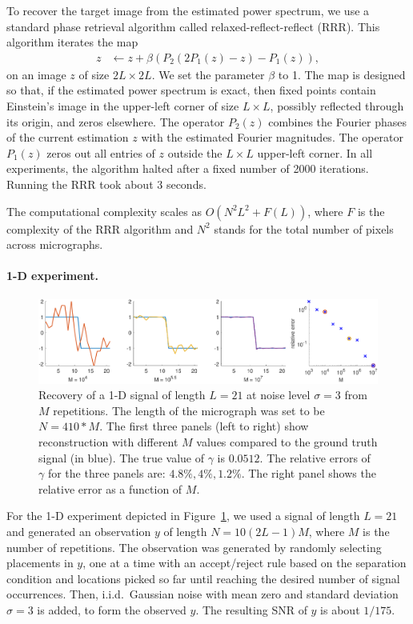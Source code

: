 \documentclass[9pt,twocolumn,twoside,lineno]{pnas-new}
\begin{document}
To recover the target image from the estimated power spectrum, we use a standard phase retrieval algorithm called relaxed-reflect-reflect (RRR). This algorithm iterates the map
\begin{align*}
z & \leftarrow z + \beta (P_2(2P_1(z) - z) - P_1(z)),
\end{align*}
on an image $z$ of size $2L\times 2L$.
We set the parameter $\beta$ to 1.
The map is designed so that, if the estimated power spectrum is exact, then fixed points contain Einstein's image in the upper-left corner of size $L \times L$, possibly reflected through its origin, and zeros elsewhere. The operator $P_2(z)$ combines the Fourier phases of  the current estimation $z$ with the estimated Fourier magnitudes. The operator $P_1(z)$ zeros out all entries of $z$ outside the $L\times L$ upper-left corner. In all experiments, the algorithm halted after a fixed number of 2000 iterations. Running the RRR took about 3 seconds. 

The computational complexity scales as $O(N^2L^2 + F(L))$, where $F$ is the complexity of the RRR algorithm and $N^2$ stands for the total number of pixels across micrographs. 

\paragraph{1-D experiment.}


\begin{figure}[t]
	\centering
	\includegraphics[width=\linewidth]{1D_example}
	\caption{\label{fig:1D_example} Recovery of a 1-D signal of length $L=21$ at noise level $\sigma = 3$ from $M$ repetitions. The length of the micrograph was set to be $N = 410*M$. The first three panels (left to right) show reconstruction with different $M$ values compared to the ground truth signal (in blue).
		The true value of $\gamma$ is $0.0512$.
		The relative errors of $\gamma$ for the three panels are: $4.8\%,4\%,1.2\%$. The right panel shows the relative error as a function of $M$. 
	}
\end{figure}



For the 1-D experiment depicted in Figure~\ref{fig:1D_example}, we used a signal of length $L=21$ and generated an observation $y$ of length $N = 10(2L-1)M$, where $M$ is the number of repetitions. 
The observation was generated by randomly selecting placements in $y$, one at a time with an accept/reject rule based on the separation condition and locations picked so far until reaching the desired number of signal occurrences. Then, i.i.d.\ Gaussian noise with mean zero and standard deviation $\sigma = 3$ is added, to form the observed $y$. The resulting SNR of $y$ is about $1/175$.
\end{document}
